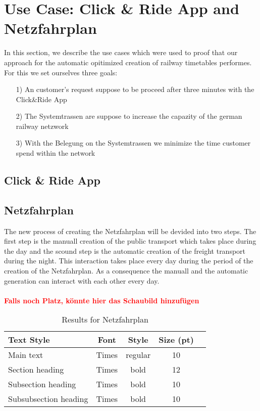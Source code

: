 \section{Use Case: Click \& Ride App and Netzfahrplan}
\label{chap:useCases}
In this section, we describe the use cases which were used to proof that our approach for the automatic opitimized creation of railway timetables performes. For this we set ourselves three goals: 

\begin{itemize}
	\item[1)] An customer's request suppose to be proceed after three minutes with the Click\&Ride App
	\item[2)] The Systemtrassen are suppose to increase the capazity of the german railway netzwork
	\item[3)] With the Belegung on the Systemtrassen we minimize the time customer spend within the network
\end{itemize}

\subsection{Click \& Ride App}
\label{chap:CnR}

\subsection{Netzfahrplan}
\label{chap:Netzfahrplan}
The new process of creating the Netzfahrplan will be devided into two steps. The first step is the manuall creation of the 
public transport which takes place during the day and the scound step is the automatic creation of the freight transport during the night. This interaction takes place every day during the period of the creation of the Netzfahrplan. As a consequence the manuall and the automatic generation can interact with each other every day. \\
\\
\textbf{\textcolor{red}{Falls noch Platz, könnte hier das Schaubild hinzufügen}}
%
\begin{table}[h]
	\centering
	\caption{Results for Netzfahrplan}
	\label{tab:result_Netzfpl}
	\begin{tabular}{lcccc} \hline
		\textbf{Text Style}   & \textbf{Font} & \textbf{Style} & \textbf{Size (pt)} \\ \hline
		Main text             & Times         & regular        & 10                 \\
		Section heading       & Times         & bold           & 12                 \\
		Subsection heading    & Times         & bold           & 10                 \\
		Subsubsection heading & Times         & bold           & 10                 \\ \hline
	\end{tabular}
\end{table}
\par


